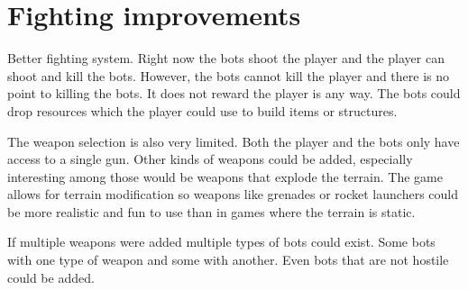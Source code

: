 \section{Fighting improvements}
Better fighting system. Right now the bots shoot the player and the player can shoot and kill the bots. 
However, the bots cannot kill the player and there is no point to killing the bots. 
It does not reward the player is any way.
The bots could drop resources which the player could use to build items or structures.

The weapon selection is also very limited.
Both the player and the bots only have access to a single gun.
Other kinds of weapons could be added, especially interesting among those would be weapons that explode the terrain.
The game allows for terrain modification so weapons like grenades or rocket launchers could be more realistic and fun to use than in games where the terrain is static.

If multiple weapons were added multiple types of bots could exist.
Some bots with one type of weapon and some with another.
Even bots that are not hostile could be added.